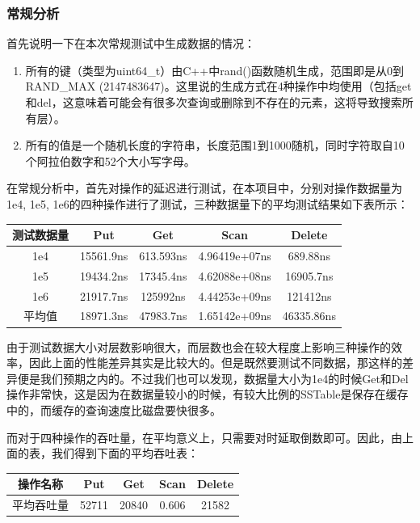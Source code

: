 \documentclass{article}
\begin{document}
\subsubsection{常规分析}

首先说明一下在本次常规测试中生成数据的情况：

\begin{enumerate}
    \item 所有的键（类型为uint64\_t）由C++中rand()函数随机生成，范围即是从0到RAND\_MAX (2147483647)。这里说的生成方式在4种操作中均使用（包括get和del，这意味着可能会有很多次查询或删除到不存在的元素，这将导致搜索所有层）。
    \item 所有的值是一个随机长度的字符串，长度范围1到1000随机，同时字符取自10个阿拉伯数字和52个大小写字母。
\end{enumerate}

在常规分析中，首先对操作的延迟进行测试，在本项目中，分别对操作数据量为1e4, 1e5, 1e6的四种操作进行了测试，三种数据量下的平均测试结果如下表所示：

\begin{table}[h]
    \centering
    \begin{tabular}{ccccc}
        \toprule
        测试数据量 & Put       & Get       & Scan          & Delete     \\
        \midrule
        1e4        & 15561.9ns & 613.593ns & 4.96419e+07ns & 689.88ns   \\
        1e5        & 19434.2ns & 17345.4ns & 4.62088e+08ns & 16905.7ns  \\
        1e6        & 21917.7ns & 125992ns  & 4.44253e+09ns & 121412ns   \\
        平均值     & 18971.3ns & 47983.7ns & 1.65142e+09ns & 46335.86ns \\
        \bottomrule
    \end{tabular}
\end{table}

由于测试数据大小对层数影响很大，而层数也会在较大程度上影响三种操作的效率，因此上面的性能差异其实是比较大的。但是既然要测试不同数据，那这样的差异便是我们预期之内的。不过我们也可以发现，数据量大小为1e4的时候Get和Del操作非常快，这是因为在数据量较小的时候，有较大比例的SSTable是保存在缓存中的，而缓存的查询速度比磁盘要快很多。

而对于四种操作的吞吐量，在平均意义上，只需要对时延取倒数即可。因此，由上面的表，我们得到下面的平均吞吐表：

\begin{table}[h]
    \centering
    \begin{tabular}{ccccc}
        \toprule
        操作名称   & Put   & Get   & Scan  & Delete \\
        \midrule
        平均吞吐量 & 52711 & 20840 & 0.606 & 21582  \\
        \bottomrule
    \end{tabular}
\end{table}
\end{document}
